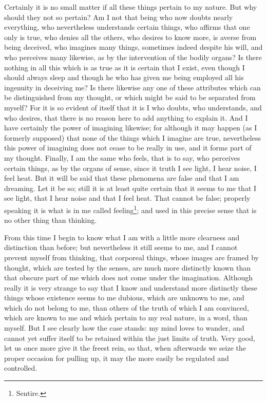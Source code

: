 Certainly it is no small matter if all these things pertain to my
nature. But why should they not so pertain? Am I not that being who
now doubts nearly everything, who nevertheless understands certain
things, who affirms that one only is true, who denies all the others,
who desires to know more, is averse from being deceived, who imagines
many things, sometimes indeed despite his will, and who perceives many
likewise, as by the intervention of the bodily organs? Is there
nothing in all this which is as true as it is certain that I exist,
even though I should always sleep and though he who has given me being
employed all his ingenuity in deceiving me? Is there likewise any one
of these attributes which can be distinguished from my thought, or
which might be said to be separated from myself? For it is so evident
of itself that it is I who doubts, who understands, and who desires,
that there is no reason here to add anything to explain it. And I have
certainly the power of imagining likewise; for although it may happen
(as I formerly supposed) that none of the things which I imagine are
true, nevertheless this power of imagining does not cease to be really
in use, and it forms part of my thought. Finally, I am the same who
feels, that is to say, who perceives certain things, as by the organs
of sense, since it truth I see light, I hear noise, I feel heat. But
it will be said that these phenomena are false and that I am dreaming.
Let it be so; still it is at least quite certain that it seems to me
that I see light, that I hear noise and that I feel heat. That cannot
be false; properly speaking it is what is in me called
feeling\footnote{Sentire.}; and used in this precise sense that is no
other thing than thinking.

From this time I begin to know what I am with a little more clearness
and distinction than before; but nevertheless it still seems to me,
and I cannot prevent myself from thinking, that corporeal things,
whose images are framed by thought, which are tested by the senses,
are much more distinctly known than that obscure part of me which does
not come under the imagination. Although really it is very strange to
say that I know and understand more distinctly these things whose
existence seems to me  dubious, which are unknown to me, and
which do not belong to me, than others of the truth of which I am
convinced, which are known to me and which pertain to my real nature,
in a word, than myself. But I see clearly how the case stands: my mind
loves to wander, and cannot yet suffer itself to be retained within
the just limits of truth. Very good, let us once more give it the
freest rein, so that, when afterwards we seize the proper occasion for
pulling up, it may the more easily be regulated and controlled.

